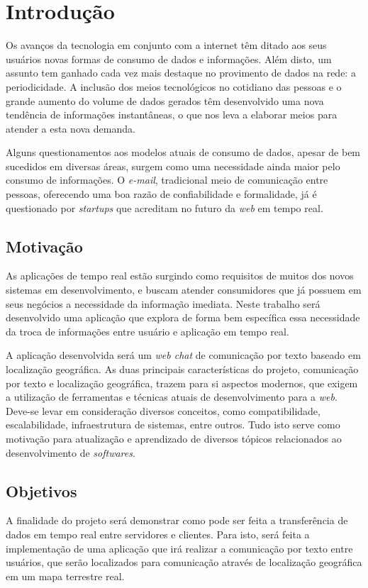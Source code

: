 \chapter{Introdução}
Os avanços da tecnologia em conjunto com a internet têm ditado aos seus usuários novas formas de consumo de dados e informações. Além disto, um assunto tem ganhado cada vez mais destaque no provimento de dados na rede: a periodicidade. A inclusão dos meios tecnológicos no cotidiano das pessoas e o grande aumento do volume de dados gerados têm desenvolvido uma nova tendência de informações instantâneas, o que nos leva a elaborar meios para atender a esta nova demanda.

Alguns questionamentos aos modelos atuais de consumo de dados,  apesar de bem sucedidos em diversas áreas, surgem como uma necessidade ainda maior pelo consumo de informações. O \textit{e-mail}, tradicional meio de comunicação entre pessoas, oferecendo uma boa razão de confiabilidade e formalidade, já é questionado por \textit{startups} \cite{startup-email-innovation1} \cite{startup-email-innovation2} que acreditam no futuro da \textit{web} em tempo real.

\section{Motivação} 
As aplicações de tempo real estão surgindo como requisitos de muitos dos novos sistemas em desenvolvimento, e buscam atender consumidores que já possuem em seus negócios a necessidade da informação imediata. Neste trabalho será desenvolvido uma aplicação que explora de forma bem específica essa necessidade da troca de informações entre usuário e aplicação em tempo real.

A aplicação desenvolvida será um \textit{web chat} de comunicação por texto baseado em localização geográfica. As duas principais características do projeto, comunicação por texto e localização geográfica, trazem para si aspectos modernos, que exigem a utilização de ferramentas e técnicas atuais de desenvolvimento para a \textit{web}. Deve-se levar em consideração diversos conceitos, como compatibilidade, escalabilidade, infraestrutura de sistemas, entre outros. Tudo isto serve como motivação para atualização e aprendizado de diversos tópicos relacionados ao desenvolvimento de \textit{softwares}.   

\section{Objetivos}
A finalidade do projeto será demonstrar como pode ser feita a transferência de dados em tempo real entre servidores e clientes. Para isto, será feita a implementação de uma aplicação que irá realizar a comunicação por texto entre usuários, que serão localizados para comunicação através de localização geográfica em um mapa terrestre real.

